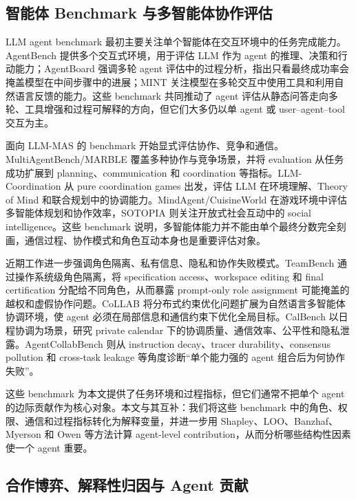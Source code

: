\subsection{智能体 Benchmark 与多智能体协作评估}

LLM agent benchmark 最初主要关注单个智能体在交互环境中的任务完成能力。AgentBench 提供多个交互式环境，用于评估 LLM 作为 agent 的推理、决策和行动能力\cite{liu2023agentbench}；AgentBoard 强调多轮 agent 评估中的过程分析，指出只看最终成功率会掩盖模型在中间步骤中的进展\cite{ma2024agentboard}；MINT 关注模型在多轮交互中使用工具和利用自然语言反馈的能力\cite{wang2023mint}。这些 benchmark 共同推动了 agent 评估从静态问答走向多轮、工具增强和过程可解释的方向，但它们大多仍以单 agent 或 user--agent--tool 交互为主。

面向 LLM-MAS 的 benchmark 开始显式评估协作、竞争和通信。MultiAgentBench/MARBLE 覆盖多种协作与竞争场景，并将 evaluation 从任务成功扩展到 planning、communication 和 coordination 等指标\cite{zhu2025multiagentbench}。LLM-Coordination 从 pure coordination games 出发，评估 LLM 在环境理解、Theory of Mind 和联合规划中的协调能力\cite{agashe2025llmcoordination}。MindAgent/CuisineWorld 在游戏环境中评估多智能体规划和协作效率\cite{gong2023mindagent}，SOTOPIA 则关注开放式社会互动中的 social intelligence\cite{zhou2024sotopia}。这些 benchmark 说明，多智能体能力并不能由单个最终分数完全刻画，通信过程、协作模式和角色互动本身也是重要评估对象。

近期工作进一步强调角色隔离、私有信息、隐私和协作失败模式。TeamBench 通过操作系统级角色隔离，将 specification access、workspace editing 和 final certification 分配给不同角色，从而暴露 prompt-only role assignment 可能掩盖的越权和虚假协作问题\cite{kim2026teambench}。CoLLAB 将分布式约束优化问题扩展为自然语言多智能体协调环境，使 agent 必须在局部信息和通信约束下优化全局目标\cite{mahmud2025collab}。CalBench 以日程协调为场景，研究 private calendar 下的协调质量、通信效率、公平性和隐私泄露\cite{zou2026calbench}。AgentCollabBench 则从 instruction decay、tracer durability、consensus pollution 和 cross-task leakage 等角度诊断“单个能力强的 agent 组合后为何协作失败”\cite{mazumder2026agentcollabbench}。

这些 benchmark 为本文提供了任务环境和过程指标，但它们通常不把单个 agent 的边际贡献作为核心对象。本文与其互补：我们将这些 benchmark 中的角色、权限、通信和过程指标转化为解释变量，并进一步用 Shapley、LOO、Banzhaf、Myerson 和 Owen 等方法计算 agent-level contribution，从而分析哪些结构性因素使一个 agent 重要。

\subsection{合作博弈、解释性归因与 Agent 贡献}

